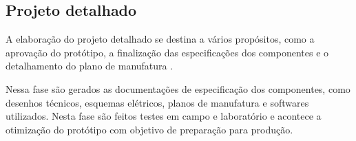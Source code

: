 \subsection{Projeto detalhado}

A elaboração do projeto detalhado se destina a vários propósitos, como a aprovação do protótipo, a finalização das especificações dos componentes e o detalhamento do plano
de manufatura \autocite{Back2008}.

Nessa fase são gerados as documentações de especificação dos componentes, como desenhos técnicos, esquemas elétricos, planos de manufatura e softwares utilizados. Nesta fase
são feitos testes em campo e laboratório e acontece a otimização do protótipo com objetivo de preparação para produção.
